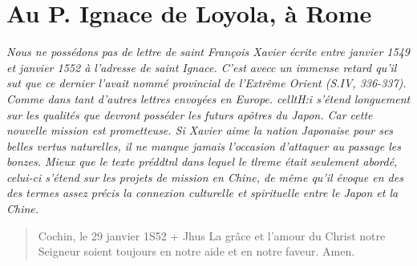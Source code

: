 \section{Au P. Ignace de Loyola, à Rome 
}
\textit{Nous ne possédons pas de lettre de saint François Xavier écrite
entre janvier 1549 et janvier 1552 à l'adresse de saint Ignace. C'est
avecc un immense retard qu'il sut que ce dernier l'avait nommé provincial
de l'Extrême Orient (S.IV, 336-337). Comme dans tant
d'autres lettres envoyées en Europe. celltH:i s'étend longuement sur
les qualités que devront posséder les futurs apôtres du Japon. Car
cette nouvelle mission est prometteuse. Si Xavier aime la nation
Japonaise pour ses belles vertus naturelles, il ne manque jamais
l'occasion d'attaquer au passage les bonzes. Mieux que le texte préddtnl
dans lequel le tlreme était seulement abordé, celui-ci s'étend
sur les projets de mission en Chine, de même qu'il évoque en des
des termes assez précis la connexion culturelle et spirituelle entre le
Japon et la Chine.}

\begin{quote}
    Cochin, le 29 janvier 1S52
+
Jhus
La grâce et l'amour du Christ notre Seigneur soient toujours en
notre aide et en notre faveur. Amen.
\end{quote}


